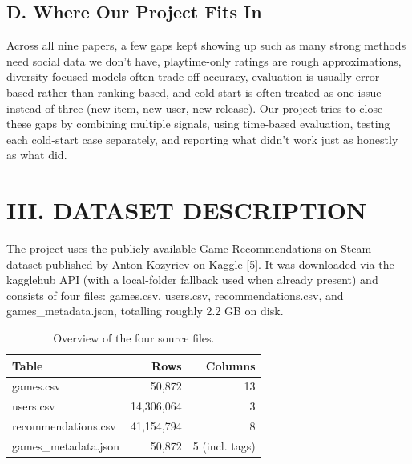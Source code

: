 \documentclass[conference]{IEEEtran}
\begin{document}
\subsection*{D. Where Our Project Fits In}

Across all nine papers, a few gaps kept showing up such as many strong methods need social data we don't have, playtime-only ratings are rough approximations, diversity-focused models often trade off accuracy, evaluation is usually error-based rather than ranking-based, and cold-start is often treated as one issue instead of three (new item, new user, new release). Our project tries to close these gaps by combining multiple signals, using time-based evaluation, testing each cold-start case separately, and reporting what didn't work just as honestly as what did.

\section*{III. DATASET DESCRIPTION}

The project uses the publicly available Game Recommendations on Steam dataset published by Anton Kozyriev on Kaggle [5]. It was downloaded via the kagglehub API (with a local-folder fallback used when already present) and consists of four files: games.csv, users.csv, recommendations.csv, and games\_metadata.json, totalling roughly 2.2 GB on disk.

\begin{table}[H]

\caption{Overview of the four source files.}

\label{tab:1}

\centering

\begin{tabular}{@{}lrr@{}}

\toprule

Table & Rows & Columns \\

\midrule

games.csv & 50,872 & 13 \\

users.csv & 14,306,064 & 3 \\

recommendations.csv & 41,154,794 & 8 \\

games\_metadata.json & 50,872 & 5 (incl. tags) \\

\bottomrule

\end{tabular}

\end{table}
\end{document}
